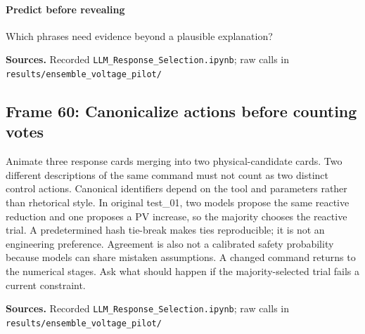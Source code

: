 \documentclass[11pt]{article}
\begin{document}
\paragraph{Predict before revealing}Which phrases need evidence beyond a plausible explanation?
\par\nopagebreak\begin{minipage}{\linewidth}{\footnotesize\color{slate}\textbf{Sources.} Recorded \texttt{LLM\_Response\_Selection.ipynb}; raw calls in \texttt{results/ensemble\_voltage\_pilot/}\par}\end{minipage}\par\medskip
\subsection*{Frame 60: Canonicalize actions before counting votes}
Animate three response cards merging into two physical-candidate cards. Two different descriptions of the same command must not count as two distinct control actions. Canonical identifiers depend on the tool and parameters rather than rhetorical style. In original test\_01, two models propose the same reactive reduction and one proposes a PV increase, so the majority chooses the reactive trial. A predetermined hash tie-break makes ties reproducible; it is not an engineering preference. Agreement is also not a calibrated safety probability because models can share mistaken assumptions. A changed command returns to the numerical stages. Ask what should happen if the majority-selected trial fails a current constraint.\par
\par\nopagebreak\begin{minipage}{\linewidth}{\footnotesize\color{slate}\textbf{Sources.} Recorded \texttt{LLM\_Response\_Selection.ipynb}; raw calls in \texttt{results/ensemble\_voltage\_pilot/}\par}\end{minipage}\par\medskip
\end{document}
